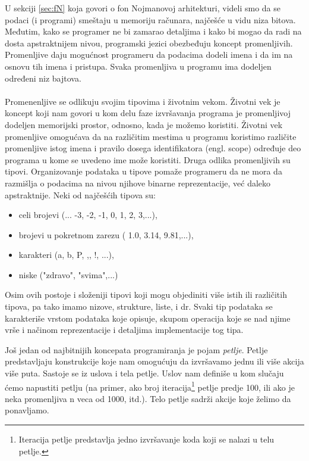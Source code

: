 \documentclass[a4paper]{article}
\begin{document}
U sekciji \ref{sec:fN} koja govori o fon Nojmanovoj arhitekturi, videli smo da se podaci (i programi) smeštaju u memoriju računara, najčešće u vidu niza bitova. Međutim, kako se programer ne bi zamarao detaljima i kako bi mogao da radi na dosta apstraktnijem nivou, programski jezici obezbeđuju koncept promenljivih. Promenljive daju mogućnost programeru da podacima dodeli imena i da im na osnovu tih imena i pristupa. Svaka promenljiva u programu ima dodeljen određeni niz bajtova. \\\\
Promenenljive se odlikuju svojim tipovima i životnim vekom. Životni vek je koncept koji nam govori u kom delu faze izvršavanja programa je promenljivoj dodeljen memorijski prostor, odnosno, kada je možemo koristiti. Životni vek promenljive omogućava da na različitim mestima u programu koristimo različite promenljive istog imena i pravilo dosega identifikatora (engl. scope) određuje deo programa u kome se uvedeno ime može koristiti. Druga odlika promenljivih su tipovi. Organizovanje podataka u tipove pomaže programeru da ne mora da razmišlja o podacima na nivou njihove binarne reprezentacije, već daleko apstraktnije. Neki od najčešćih tipova su:
\begin{itemize}
\item celi brojevi (... -3, -2, -1, 0, 1, 2, 3,...),
\item brojevi u pokretnom zarezu ( 1.0, 3.14, 9.81,...),
\item karakteri (a, b, P, ,, !, ...),
\item niske ("zdravo", "svima",...)
\end{itemize} 
Osim ovih postoje i složeniji tipovi koji mogu objediniti više istih ili različitih tipova, pa tako imamo nizove, strukture, liste, i dr.
Svaki tip podataka se karakteriše vrstom podataka koje opisuje, skupom operacija koje se nad njime vrše i načinom reprezentacije i detaljima implementacije tog tipa.

Još jedan od najbitnijih koncepata programiranja je pojam {\em petlje}. Petlje predstavljaju konstrukcije koje nam omogućuju da izvršavamo jednu ili više akcija više puta. Sastoje se iz uslova i tela petlje. Uslov nam definiše u kom slučaju ćemo napustiti petlju (na primer, ako broj iteracija\footnote{Iteracija petlje predstavlja jedno izvršavanje koda koji se nalazi u telu petlje.} petlje predje 100, ili ako je neka promenljiva n veca od 1000, itd.). Telo petlje sadrži akcije koje želimo da ponavljamo.
\end{document}

